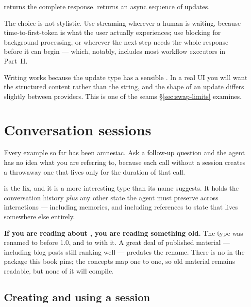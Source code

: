  returns the complete response.  returns an
async sequence of updates.

The choice is not stylistic. Use streaming wherever a human is waiting, because
time-to-first-token is what the user actually experiences; use blocking for
background processing, or wherever the next step needs the whole response before
it can begin --- which, notably, includes most workflow executors in Part~II.

\begin{note}
Writing  works because the update type has a sensible
. In a real UI you will want the structured content rather than the
string, and the shape of an update differs slightly between providers. This is
one of the seams \S\ref{sec:swap-limits} examines.
\end{note}

\section{Conversation sessions}
\label{sec:sessions}

Every example so far has been amnesiac. Ask a follow-up question and the agent
has no idea what you are referring to, because each  call without a
session creates a throwaway one that lives only for the duration of that call.

 is the fix, and it is a more interesting type than its name
suggests. It holds the conversation history \emph{plus} any other state the agent
must preserve across interactions --- including memories, and including
references to state that lives somewhere else entirely.

\begin{note}
\textbf{If you are reading about , you are reading something
old.} The type was renamed to  before 1.0, and
 to  with it. A great deal of published
material --- including blog posts still ranking well --- predates the rename.
There is no  in the package this book pins; the concepts map one
to one, so old material remains readable, but none of it will compile.
\end{note}

\subsection{Creating and using a session}

